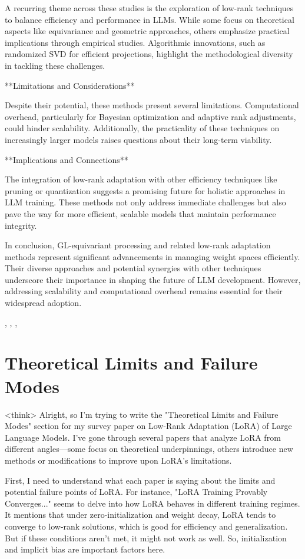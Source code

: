 \documentclass[conference]{IEEEtran}
\begin{document}
A recurring theme across these studies is the exploration of low-rank techniques to balance efficiency and performance in LLMs. While some focus on theoretical aspects like equivariance and geometric approaches, others emphasize practical implications through empirical studies. Algorithmic innovations, such as randomized SVD for efficient projections, highlight the methodological diversity in tackling these challenges.

**Limitations and Considerations**

Despite their potential, these methods present several limitations. Computational overhead, particularly for Bayesian optimization and adaptive rank adjustments, could hinder scalability. Additionally, the practicality of these techniques on increasingly larger models raises questions about their long-term viability.

**Implications and Connections**

The integration of low-rank adaptation with other efficiency techniques like pruning or quantization suggests a promising future for holistic approaches in LLM training. These methods not only address immediate challenges but also pave the way for more efficient, scalable models that maintain performance integrity.

In conclusion, GL-equivariant processing and related low-rank adaptation methods represent significant advancements in managing weight spaces efficiently. Their diverse approaches and potential synergies with other techniques underscore their importance in shaping the future of LLM development. However, addressing scalability and computational overhead remains essential for their widespread adoption.

\cite{bX}, \cite{bY}, \cite{bZ}, \cite{bW}

\section{Theoretical Limits and Failure Modes}
<think>
Alright, so I'm trying to write the "Theoretical Limits and Failure Modes" section for my survey paper on Low-Rank Adaptation (LoRA) of Large Language Models. I've gone through several papers that analyze LoRA from different angles—some focus on theoretical underpinnings, others introduce new methods or modifications to improve upon LoRA's limitations. 

First, I need to understand what each paper is saying about the limits and potential failure points of LoRA. For instance, "LoRA Training Provably Converges..." seems to delve into how LoRA behaves in different training regimes. It mentions that under zero-initialization and weight decay, LoRA tends to converge to low-rank solutions, which is good for efficiency and generalization. But if these conditions aren't met, it might not work as well. So, initialization and implicit bias are important factors here.
\end{document}
